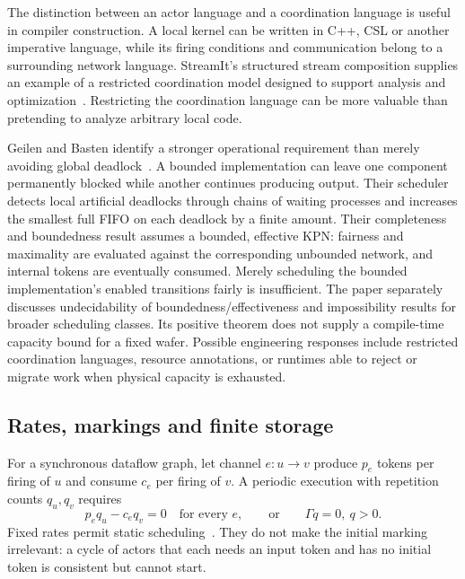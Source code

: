 \documentclass[final,3p,times,authoryear]{elsarticle}
\begin{document}
The distinction between an actor language and a coordination language is useful in compiler construction. A local kernel can be written in C++, CSL or another imperative language, while its firing conditions and communication belong to a surrounding network language. StreamIt's structured stream composition supplies an example of a restricted coordination model designed to support analysis and optimization~\citep{thies2002}. Restricting the coordination language can be more valuable than pretending to analyze arbitrary local code.

Geilen and Basten identify a stronger operational requirement than merely avoiding global deadlock~\citep{geilen2003}. A bounded implementation can leave one component permanently blocked while another continues producing output. Their scheduler detects local artificial deadlocks through chains of waiting processes and increases the smallest full FIFO on each deadlock by a finite amount. Their completeness and boundedness result assumes a bounded, effective KPN: fairness and maximality are evaluated against the corresponding unbounded network, and internal tokens are eventually consumed. Merely scheduling the bounded implementation's enabled transitions fairly is insufficient. The paper separately discusses undecidability of boundedness/effectiveness and impossibility results for broader scheduling classes. Its positive theorem does not supply a compile-time capacity bound for a fixed wafer. Possible engineering responses include restricted coordination languages, resource annotations, or runtimes able to reject or migrate work when physical capacity is exhausted.

\subsection{Rates, markings and finite storage}\label{sec:rates}
For a synchronous dataflow graph, let channel $e:u\to v$ produce $p_e$ tokens per firing of $u$ and consume $c_e$ per firing of $v$. A periodic execution with repetition counts $q_u,q_v$ requires
\begin{equation}\label{eq:balance}
 p_eq_u-c_eq_v=0\quad\text{for every }e,
 \qquad\text{or}\qquad \Gamma q=0,\ q>0.
\end{equation}
Fixed rates permit static scheduling~\citep{lee1987static}. They do not make the initial marking irrelevant: a cycle of actors that each needs an input token and has no initial token is consistent but cannot start.
\end{document}
